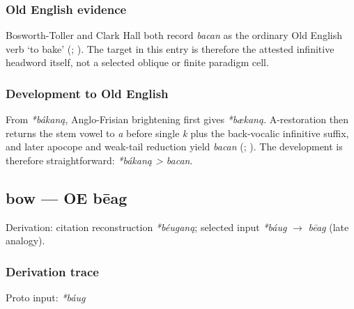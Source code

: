 \documentclass[
  british,
  a4paper,
]{article}
\begin{document}
\subsubsection{Old English evidence}\label{old-english-evidence}

Bosworth-Toller and Clark Hall both record \emph{bacan} as the ordinary
Old English verb `to bake' (; ).
The target in this entry is therefore the attested infinitive headword
itself, not a selected oblique or finite paradigm cell.

\subsubsection{Development to Old
English}\label{development-to-old-english}

From \emph{*bákaną}, Anglo-Frisian brightening first gives
\emph{*bækaną}. A-restoration then returns the stem vowel to \emph{a}
before single \emph{k} plus the back-vocalic infinitive suffix, and
later apocope and weak-tail reduction yield \emph{bacan}
(;
). The development
is therefore straightforward: \emph{*bákaną \textgreater{} bacan}.

\subsection{bow --- OE bēag}\label{bow-oe-bux113ag}

Derivation: citation reconstruction \emph{*béuganą}; selected input
\emph{*báug} \(\rightarrow\) \emph{bēag} (late analogy).

\subsubsection{Derivation trace}\label{derivation-trace-1}

Proto input: \emph{*báug}

\begingroup
\setlength{\fboxsep}{6pt}
\end{document}
